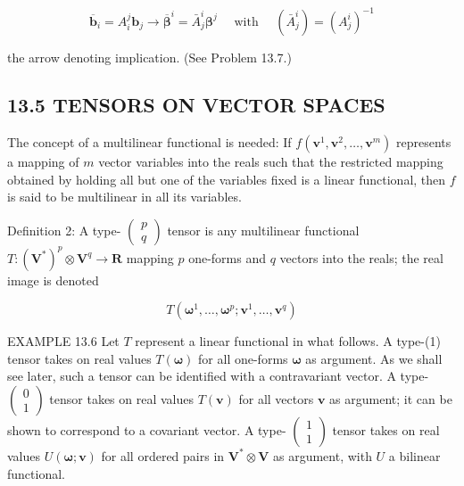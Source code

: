 \documentclass[10pt]{article}
\begin{document}
\begin{equation*}
\overline{\mathbf{b}}_{i}=A_{i}^{j} \mathbf{b}_{j} \rightarrow \overline{\boldsymbol{\beta}}^{i}=\bar{A}_{j}^{i} \boldsymbol{\beta}^{j} \quad \text { with } \quad\left(\bar{A}_{j}^{i}\right)=\left(A_{j}^{i}\right)^{-1} \tag{13.6}
\end{equation*}


the arrow denoting implication. (See Problem 13.7.)

\subsection*{13.5 TENSORS ON VECTOR SPACES}
The concept of a multilinear functional is needed: If $f\left(\mathbf{v}^{1}, \mathbf{v}^{2}, \ldots, \mathbf{v}^{m}\right)$ represents a mapping of $m$ vector variables into the reals such that the restricted mapping obtained by holding all but one of the variables fixed is a linear functional, then $f$ is said to be multilinear in all its variables.

Definition 2: A type- $\left(\begin{array}{c}p \\ q\end{array}\right)$ tensor is any multilinear functional $T:\left(\mathbf{V}^{*}\right)^{p} \otimes \mathbf{V}^{q} \rightarrow \mathbf{R}$ mapping $p$ one-forms and $q$ vectors into the reals; the real image is denoted

$$
T\left(\boldsymbol{\omega}^{1}, \ldots, \boldsymbol{\omega}^{p} ; \mathbf{v}^{1}, \ldots, \mathbf{v}^{q}\right)
$$

EXAMPLE 13.6 Let $T$ represent a linear functional in what follows. A type-(1) tensor takes on real values $T(\boldsymbol{\omega})$ for all one-forms $\boldsymbol{\omega}$ as argument. As we shall see later, such a tensor can be identified with a contravariant vector. A type- $\left(\begin{array}{l}0 \\ 1\end{array}\right)$ tensor takes on real values $T(\mathbf{v})$ for all vectors $\mathbf{v}$ as argument; it can be shown to correspond to a covariant vector. A type- $\left(\begin{array}{c}1 \\ 1\end{array}\right)$ tensor takes on real values $U(\boldsymbol{\omega} ; \mathbf{v})$ for all ordered pairs in $\mathbf{V}^{*} \otimes \mathbf{V}$ as argument, with $U$ a bilinear functional.
\end{document}
